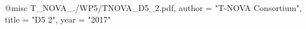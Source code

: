 @misc{ T_NOVA_./WP5/TNOVA_D5_2.pdf,
       author = "{T-NOVA Consortium}",
       title = "D5 2",
       year = "2017" }
